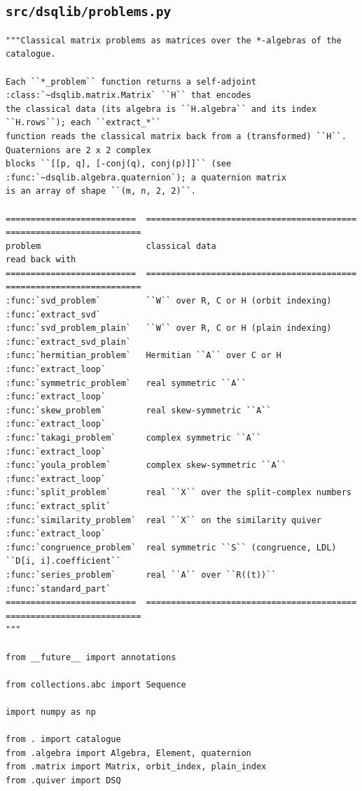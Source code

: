 \documentclass[12pt, a4paper]{report}
\theoremstyle{plain}
\theoremstyle{definition}
\theoremstyle{remark}
\theoremstyle{plain}
\begin{document}
\subsection{\texorpdfstring{\texttt{src/dsqlib/problems.py}}{src/dsqlib/problems.py}}
\begin{lstlisting}[style=dsqcode]
"""Classical matrix problems as matrices over the *-algebras of the catalogue.

Each ``*_problem`` function returns a self-adjoint :class:`~dsqlib.matrix.Matrix` ``H`` that encodes
the classical data (its algebra is ``H.algebra`` and its index ``H.rows``); each ``extract_*``
function reads the classical matrix back from a (transformed) ``H``. Quaternions are 2 x 2 complex
blocks ``[[p, q], [-conj(q), conj(p)]]`` (see :func:`~dsqlib.algebra.quaternion`); a quaternion matrix
is an array of shape ``(m, n, 2, 2)``.

==========================  ==========================================  ===========================
problem                     classical data                              read back with
==========================  ==========================================  ===========================
:func:`svd_problem`         ``W`` over R, C or H (orbit indexing)       :func:`extract_svd`
:func:`svd_problem_plain`   ``W`` over R, C or H (plain indexing)       :func:`extract_svd_plain`
:func:`hermitian_problem`   Hermitian ``A`` over C or H                 :func:`extract_loop`
:func:`symmetric_problem`   real symmetric ``A``                        :func:`extract_loop`
:func:`skew_problem`        real skew-symmetric ``A``                   :func:`extract_loop`
:func:`takagi_problem`      complex symmetric ``A``                     :func:`extract_loop`
:func:`youla_problem`       complex skew-symmetric ``A``                :func:`extract_loop`
:func:`split_problem`       real ``X`` over the split-complex numbers   :func:`extract_split`
:func:`similarity_problem`  real ``X`` on the similarity quiver         :func:`extract_loop`
:func:`congruence_problem`  real symmetric ``S`` (congruence, LDL)      ``D[i, i].coefficient``
:func:`series_problem`      real ``A`` over ``R((t))``                  :func:`standard_part`
==========================  ==========================================  ===========================
"""

from __future__ import annotations

from collections.abc import Sequence

import numpy as np

from . import catalogue
from .algebra import Algebra, Element, quaternion
from .matrix import Matrix, orbit_index, plain_index
from .quiver import DSQ


\end{lstlisting}
\end{document}
